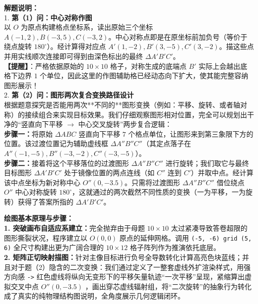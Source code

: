 {\small\color{gray}
\textbf{解题说明：}\\
1. \textbf{第（1）问：中心对称作图}\\
以 $O$ 为原点构建格点坐标系，读出原始三个坐标 $A(-1,2), B(-3,5), C(-3,2)$。中心对称点即是在原坐标前加负号（等价于绕点旋转 $180^\circ$）。经计算得对应点 $A'(1,-2), B'(3,-5), C'(3,-2)$。描这些点并用实线顺次连接即可得到由深色标出的最终 $\Delta A'B'C'$。\\
\textbf{【提醒】}：严格依据原始的 $10\times10$ 格子，对称生成的底端点 $B'$ 实际上会越出底格下边界 $1$ 个单位，因此这里的作图辅助格已经动态向下扩大，使其能完整容纳图形展示！\\
2. \textbf{第（2）问：图形两次复合变换路径设计}\\
根据题意探究是否能用两次**不同的**图形变换（例如：平移、旋转、或者轴对称）的接续组合来实现目标效果。我们仔细观察图形相对位置，完全可以规划出干净的“竖直向下平移 $\rightarrow$ 中心交叉旋转”两步复合逻辑：\\
\textbf{步骤一：}将原始 $\Delta ABC$ 竖直向下平移 $7$ 个格点单位，让图形来到第三象限下方的位置。该过渡位置记为辅助虚线框 $\Delta A''B''C''$（其定点落子在 $A''(-1,-5), B''(-3,-2), C''(-3,-5)$）。\\
\textbf{步骤二：}接着将这个平移落位的过渡图形 $\Delta A''B''C''$ 进行旋转；我们取它与最终目标图形 $\Delta A'B'C'$ 处于镜像位置的两点连线（如 $C''$ 连到 $C'$）并取中点。经计算该中点坐标为新对称中心 $O''(0, -3.5)$。只需将过渡图形 $\Delta A''B''C''$ 借位绕点 $O''$ 中心对称旋转 $180^\circ$，这就通过的两次截然不同性质的变换（一为平移，一为旋转）获得了答案所指的 $\Delta A'B'C'$。
}

\vspace{0.6cm}

{\small\color{blue!70!black}
\textbf{绘图基本原理与步骤：}\\
\textbf{1. 突破画布自适应系建立：}完全抛弃由于母题 $10\times10$ 太过紧凑导致答卷超限的图形撕裂状况，程序建立以 $O(0,0)$ 原点的延伸网格。调用 \texttt{(-5, -6) grid (5, 6)} 全尺寸构建出更为广阔合理的 $10\times12$ 格子阵列作为推演依托底层。\\
\textbf{2. 矩阵正切映射描图：}针对主像目标进行负号全导数转化计算高亮色块蓝线；并且对于题（2）隐含的二次变换：我们通过定义了一整套虚线外扩渲染样式，用强方向感 \texttt{->} 红色虚线将纵向无变形下的平移矢量轨迹“一次平移”呈现，紧缩算出虚拟交叉中点 $O''(0, -3.5)$ ，画出穿芯虚线辐射组，将“二次旋转”的抽象行为转化成了真实的纯物理结构图说明，全角度展示几何逻辑闭环。
}






